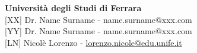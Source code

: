 \def\vhhistoryname{Revisioni}%
\def\vhversionname{Revisione}%
\def\vhdatename{Data}%
\def\vhauthorname{Autori}%
\def\vhchangename{Descrizione}%

\begin{versionhistory}
\end{versionhistory}

\vspace{3cm}

\noindent\large\textbf{Università degli Studi di Ferrara}\\

\noindent\normalsize [XX] Dr. Name Surname - name.surname@xxx.com\\
\noindent\normalsize [YY] Dr. Name Surname - name.surname@xxx.com\\
\noindent\normalsize [LN] Nicolè Lorenzo - \href{mailto:lorenzo.nicole@edu.unife.it}{lorenzo.nicole@edu.unife.it}
